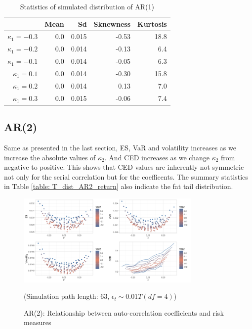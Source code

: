\documentclass[11pt]{article}
\begin{document}
\begin{table}[H]
\centering
\begin{tabular}{|r |r r r r|}
\hline
& Mean & Sd & Sknewness & Kurtosis \\
\hline
$\kappa_1 = -0.3$ & 0.0 & 0.015 & -0.53 & 18.8\\
$\kappa_1 = -0.2$ & 0.0 & 0.014 & -0.13 & 6.4\\
$\kappa_1 = -0.1$ & 0.0 & 0.014 & -0.05 & 6.3\\
$\kappa_1 = 0.1$ & 0.0 & 0.014 & -0.30 & 15.8\\
$\kappa_1 = 0.2$ & 0.0 & 0.014 & 0.13 & 7.0\\
$\kappa_1 = 0.3$ & 0.0 & 0.015 & -0.06 & 7.4\\
\hline
\end{tabular}
\caption{Statistics of simulated distribution of AR(1)}
\label{table: T_dist_AR1_return}
\end{table}

\subsection{AR(2)}

Same as presented in the last section, ES, VaR and volatility increases as we increase the absolute values of $\kappa_2$. And CED increases as we change $\kappa_2$ from negative to positive. This shows that CED values are inherently not symmetric not only for the serial correlation but for the coefficents. The summary statistics in Table \ref{table: T_dist_AR2_return} also indicate the fat tail distribution.

\begin{figure}[H]
\centering
\includegraphics[width = 0.8\textwidth]{../figures/simulation/T_dist_AR2_risk_measures}
\caption{AR(2): Relationship between auto-correlation coefficients and risk measures}
(Simulation path length: 63, $\epsilon_t \sim 0.01T(df = 4)$)
\label{fig:T_dist_AR2_risk_measures}
\end{figure}
\end{document}
